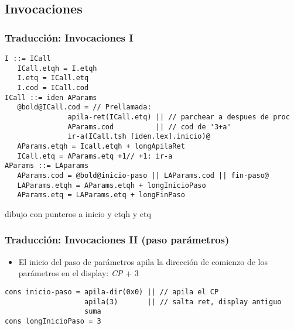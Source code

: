 \documentclass[hyperref={pdfpagelabels=false},tree-dvips,compress]{beamer}
\begin{document}
\subsection{Invocaciones}
\begin{frame}[fragile]
\frametitle{Traducción: Invocaciones I}

\begin{lstlisting}[style=gramaticas,basicstyle=\scriptsize\ttfamily,mathescape]
I ::= ICall
   ICall.etqh = I.etqh
   I.etq = ICall.etq
   I.cod = ICall.cod
ICall ::= iden AParams
   @bold@ICall.cod = // Prellamada:
               apila-ret(ICall.etq) || // parchear a despues de proc
               AParams.cod          || // cod de '3+a'
               ir-a(ICall.tsh [iden.lex].inicio)@
   AParams.etqh = Icall.etqh + longApilaRet
   ICall.etq = AParams.etq +1// +1: ir-a
AParams ::= LAparams
   AParams.cod = @bold@inicio-paso || LAParams.cod || fin-paso@
   LAParams.etqh = AParams.etqh + longInicioPaso
   AParams.etq = LAParams.etq + longFinPaso
\end{lstlisting}

	dibujo con punteros a inicio y etqh y etq


\end{frame}
\begin{frame}[fragile]
\frametitle{Traducción: Invocaciones II (paso parámetros)}

\begin{itemize}
	\item El inicio del paso de parámetros apila la dirección de comienzo de los parámetros en el display: \emph{CP} + 3
\end{itemize}

\begin{lstlisting}[style=codigoMP,basicstyle=\scriptsize\ttfamily,mathescape]
cons inicio-paso = apila-dir(0x0) || // apila el CP
                   apila(3)       || // salta ret, display antiguo
                   suma
cons longInicioPaso = 3
\end{lstlisting}

\end{frame}
\end{document}
